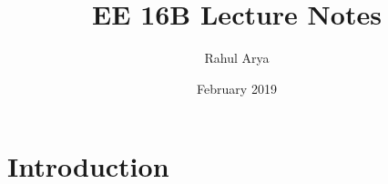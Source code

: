\documentclass{article}
\title{EE 16B Lecture Notes}
\author{Rahul Arya}
\date{February 2019}
\begin{document}
\maketitle

\section{Introduction}
\end{document}
